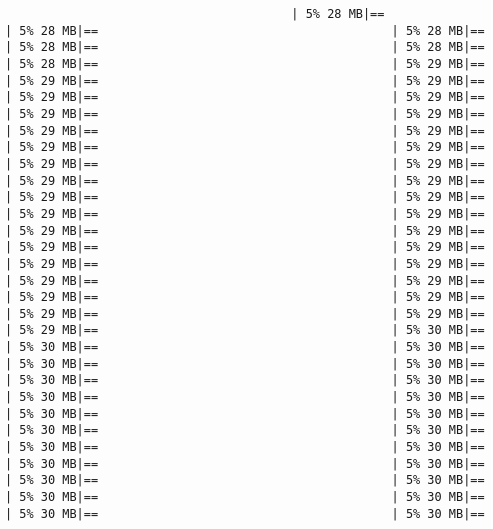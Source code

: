 \documentclass[
]{article}
\begin{document}
\begin{verbatim}
                                        | 5% 28 MB|==                                         | 5% 28 MB|==                                         | 5% 28 MB|==                                         | 5% 28 MB|==                                         | 5% 28 MB|==                                         | 5% 28 MB|==                                         | 5% 29 MB|==                                         | 5% 29 MB|==                                         | 5% 29 MB|==                                         | 5% 29 MB|==                                         | 5% 29 MB|==                                         | 5% 29 MB|==                                         | 5% 29 MB|==                                         | 5% 29 MB|==                                         | 5% 29 MB|==                                         | 5% 29 MB|==                                         | 5% 29 MB|==                                         | 5% 29 MB|==                                         | 5% 29 MB|==                                         | 5% 29 MB|==                                         | 5% 29 MB|==                                         | 5% 29 MB|==                                         | 5% 29 MB|==                                         | 5% 29 MB|==                                         | 5% 29 MB|==                                         | 5% 29 MB|==                                         | 5% 29 MB|==                                         | 5% 29 MB|==                                         | 5% 29 MB|==                                         | 5% 29 MB|==                                         | 5% 29 MB|==                                         | 5% 29 MB|==                                         | 5% 29 MB|==                                         | 5% 29 MB|==                                         | 5% 29 MB|==                                         | 5% 29 MB|==                                         | 5% 29 MB|==                                         | 5% 29 MB|==                                         | 5% 30 MB|==                                         | 5% 30 MB|==                                         | 5% 30 MB|==                                         | 5% 30 MB|==                                         | 5% 30 MB|==                                         | 5% 30 MB|==                                         | 5% 30 MB|==                                         | 5% 30 MB|==                                         | 5% 30 MB|==                                         | 5% 30 MB|==                                         | 5% 30 MB|==                                         | 5% 30 MB|==                                         | 5% 30 MB|==                                         | 5% 30 MB|==                                         | 5% 30 MB|==                                         | 5% 30 MB|==                                         | 5% 30 MB|==                                         | 5% 30 MB|==                                         | 5% 30 MB|==                                         | 5% 30 MB|==                                         | 5% 30 MB|==                                         | 5% 30 MB|==                                         | 5% 30 MB|==                          
\end{verbatim}
\end{document}
